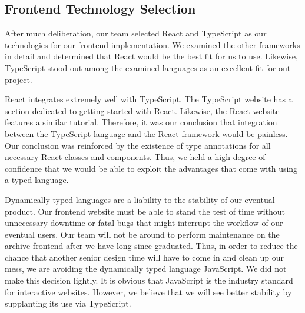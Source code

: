 \documentclass[12pt]{report}
\begin{document}
\subsection*{Frontend Technology Selection}

After much deliberation, our team selected React and TypeScript as our technologies for our frontend implementation. We examined the other frameworks in detail and determined that React would be the best fit for us to use. Likewise, TypeScript stood out among the examined languages as an excellent fit for out project.

React integrates extremely well with TypeScript. The TypeScript website has a section dedicated to getting started with React.\cite{typescriptreacttutorial} Likewise, the React website features a similar tutorial.\cite{reacttypescripttutorial} Therefore, it was our conclusion that integration between the TypeScript language and the React framework would be painless. Our conclusion was reinforced by the existence of type annotations for all necessary React classes and components. Thus, we held a high degree of confidence that we would be able to exploit the advantages that come with using a typed language.

Dynamically typed languages are a liability to the stability of our eventual product. Our frontend website must be able to stand the test of time without unnecessary downtime or fatal bugs that might interrupt the workflow of our eventual users. Our team will not be around to perform maintenance on the archive frontend after we have long since graduated. Thus, in order to reduce the chance that another senior design time will have to come in and clean up our mess, we are avoiding the dynamically typed language JavaScript. We did not make this decision lightly. It is obvious that JavaScript is the industry standard for interactive websites. However, we believe that we will see better stability by supplanting its use via TypeScript.
\end{document}
